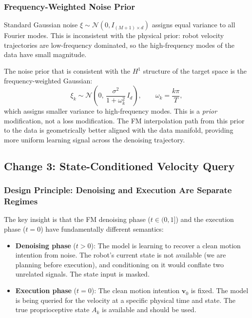 \documentclass[11pt]{article}
\theoremstyle{plain}
\theoremstyle{definition}
\newcommand{\cN}{\mathcal{N}}
\newcommand{\tdiff}{t}
\newcommand{\chunk}{\mathbf{v}}
\newcommand{\chunkclean}{\chunk_0}
\begin{document}
\subsubsection{Frequency-Weighted Noise Prior}

Standard Gaussian noise $\xi \sim \cN(0, I_{(M+1)\times d})$ assigns
equal variance to all Fourier modes.
This is inconsistent with the physical prior: robot velocity trajectories
are low-frequency dominated, so the high-frequency modes of the data have
small magnitude.

The noise prior that is consistent with the $H^1$ structure of the target
space is the frequency-weighted Gaussian:
\begin{equation}
  \label{eq:freq_noise}
  \xi_k \sim \cN\!\left(0,\, \frac{\sigma^2}{1+\omega_k^2}\,I_d\right),
  \qquad \omega_k = \frac{k\pi}{T},
\end{equation}
which assigns smaller variance to high-frequency modes.
This is a \emph{prior} modification, not a loss modification.
The FM interpolation path from this prior to the data is geometrically
better aligned with the data manifold, providing more uniform learning
signal across the denoising trajectory.

\subsection{Change 3: State-Conditioned Velocity Query}
\label{sec:state_query}

\subsubsection{Design Principle: Denoising and Execution Are Separate Regimes}

The key insight is that the FM denoising phase ($\tdiff \in (0,1]$) and
the execution phase ($\tdiff = 0$) have fundamentally different semantics:

\begin{itemize}[leftmargin=2em,noitemsep]
  \item \textbf{Denoising phase} ($\tdiff > 0$): The model is learning
    to recover a clean motion intention from noise.
    The robot's current state is not available (we are planning before
    execution), and conditioning on it would conflate two unrelated signals.
    The state input is masked.
  \item \textbf{Execution phase} ($\tdiff = 0$): The clean motion intention
    $\chunkclean$ is fixed. The model is being queried for the velocity
    at a specific physical time and state.
    The true proprioceptive state $A_k$ is available and should be used.
\end{itemize}
\end{document}
